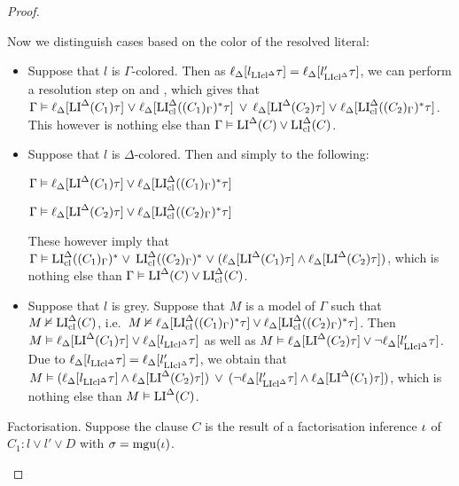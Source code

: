 \documentclass[,%
	draft=false,%
	numbers=noendperiod
	11pt,
	a4paper,
	oneside,%
	openany,
]{memoir}
\begin{document}
\begin{proof}
\begin{description}
			Now we distinguish cases based on the color of the resolved literal:

			\begin{itemize}
				\item Suppose that $l$ is $\Gamma$-colored.
					Then as
					$\ell_{\Delta}[l_{\operatorname{LIcl}^\Delta}\tau] = 
					\ell_{\Delta}[l'_{\operatorname{LIcl}^\Delta}\tau]$, 
					we can perform a resolution step on \markA{} and \markB{}, which gives that
					$\Gamma \vDash
					\ell_{\Delta}[\operatorname{LI}^\Delta(C_1)\tau] \;{\lor}\; \ell_{\Delta}[\operatorname{LI}_{\operatorname{cl}}^\Delta( (C_1)_\Gamma )^*\tau] \;\,{\lor}\;\, 
					\ell_{\Delta}[\operatorname{LI}^\Delta(C_2)\tau] \;{\lor}\; \ell_{\Delta}[\operatorname{LI}_{\operatorname{cl}}^\Delta( (C_2)_\Gamma )^*\tau]$.
					This however is nothing else than $\Gamma\vDash \operatorname{LI}^\Delta(C) \lor \operatorname{LI}_{\operatorname{cl}}^\Delta(C)$.

				\item Suppose that $l$ is $\Delta$-colored. Then \markA{} and \markB{} simply to the following:

					$\Gamma \vDash \ell_{\Delta}[\operatorname{LI}^\Delta(C_1)\tau] \lor \ell_{\Delta}[\operatorname{LI}_{\operatorname{cl}}^\Delta( (C_1)_\Gamma )^*\tau]$

					$\Gamma \vDash \ell_{\Delta}[\operatorname{LI}^\Delta(C_2)\tau] \lor \ell_{\Delta}[\operatorname{LI}_{\operatorname{cl}}^\Delta( (C_2)_\Gamma )^*\tau]$

					These however imply that 
					$\Gamma \vDash 
					\operatorname{LI}_{\operatorname{cl}}^\Delta( (C_1)_\Gamma )^* \;{\lor}\; \operatorname{LI}_{\operatorname{cl}}^\Delta( (C_2)_\Gamma )^* \;{\lor}\;\allowbreak
					(\ell_{\Delta}[\operatorname{LI}^\Delta(C_1)\tau] \land
					\ell_{\Delta}[\operatorname{LI}^\Delta(C_2)\tau] )$, which is nothing else than
					$\Gamma \vDash \operatorname{LI}^\Delta(C) \lor \operatorname{LI}_{\operatorname{cl}}^\Delta(C)$.

				\item Suppose that $l$ is grey.
					Suppose that $M$ is a model of $\Gamma$ such that
					$M\nvDash \operatorname{LI}_{\operatorname{cl}}^\Delta(C)$, i.e.\ 
					$M\nvDash \ell_{\Delta}[\operatorname{LI}_{\operatorname{cl}}^\Delta( (C_1)_\Gamma )^*\tau] \lor \ell_{\Delta}[\operatorname{LI}_{\operatorname{cl}}^\Delta( (C_2)_\Gamma )^*\tau]$.
					Then $M \vDash \ell_{\Delta}[\operatorname{LI}^\Delta(C_1)\tau] \lor \ell_{\Delta}[l_{\operatorname{LIcl}^\Delta}\tau]$
					as well as 
					$M \vDash \ell_{\Delta}[\operatorname{LI}^\Delta(C_2)\tau] \lor \lnot \ell_{\Delta}[l'_{\operatorname{LIcl}^\Delta}\tau]$.
					Due to $\ell_{\Delta}[l_{\operatorname{LIcl}^\Delta}\tau] = 
					\ell_{\Delta}[l'_{\operatorname{LIcl}^\Delta}\tau]$,
					we obtain that
					$M\vDash (\ell_{\Delta}[l_{\operatorname{LIcl}^\Delta}\tau] \land \ell_{\Delta}[\operatorname{LI}^\Delta(C_2)\tau]) \;\,{\lor}\;\,
					(\lnot \ell_{\Delta}[l'_{\operatorname{LIcl}^\Delta}\tau] \land \ell_{\Delta}[\operatorname{LI}^\Delta(C_1)\tau])$,
					which is nothing else than $M\vDash \operatorname{LI}^\Delta(C)$.

			\end{itemize}



		\item{} Factorisation. 
			Suppose the clause $C$ is the result of a factorisation inference $\iota$ of $C_1: l \lor l' \lor D$ with $\sigma=\operatorname{mgu}(\iota)$.


\end{description}
\end{proof}
\end{document}
